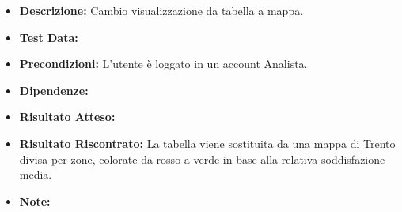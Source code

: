\begin{itemize}
\begin{itemize}
                    \item \textbf{Descrizione:} Cambio visualizzazione da tabella a mappa.
                    \item \textbf{Test Data:}
                    \item \textbf{Precondizioni:} L'utente è loggato in un account Analista.
                    \item \textbf{Dipendenze:}
                    \item \textbf{Risultato Atteso:}
                    \item \textbf{Risultato Riscontrato:} La tabella viene sostituita da una mappa di Trento divisa per zone, colorate da rosso a verde in base alla relativa soddisfazione media.
                    \item \textbf{Note:}
                \end{itemize}
        \end{itemize}
        

